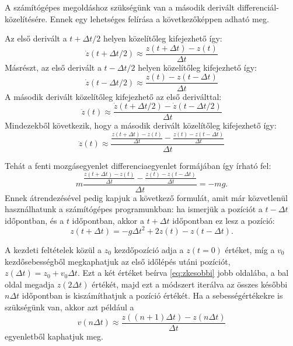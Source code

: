 \documentclass[%
 reprint,onecolumn,
 amsmath,amssymb,
 aps,
]{revtex4-2}
\begin{document}
A számítógépes megoldáshoz szükségünk van 
a második derivált differenciál-közelítésére.
Ennek egy lehetséges felírása a következőképpen
adható meg. 

Az első derivált a $t+\Delta t/2$ helyen 
közelítőleg kifejezhető így:
\begin{equation}
   \dot{z}(t+\Delta t/2)
   \approx \frac{z(t+\Delta t) - z(t)}{\Delta t}
\end{equation}
Másrészt, az 
első derivált a $t-\Delta t/2$ helyen 
közelítőleg kifejezhető így:
\begin{equation}
    \dot{z}(t-\Delta t/2) \approx 
    \frac{z(t) - z(t-\Delta t)}{\Delta t}
\end{equation}
A második derivált közelítőleg kifejezhető 
az első deriválttal: 
\begin{equation}
\ddot{z}(t)
\approx 
\frac{\dot{z}(t+\Delta t/2) - \dot{z}(t-\Delta t/2)}{\Delta t}
\end{equation}
Mindezekből következik, hogy 
a második derivált
közelítőleg kifejezhető így:
\begin{equation}
\ddot{z}(t)
\approx 
  \frac{\frac{z(t+\Delta t) - z(t)}{\Delta t}
  - \frac{z(t) - z(t-\Delta t)}{\Delta t}}{\Delta t}
\end{equation}



    
Tehát a fenti mozgásegyenlet 
differenciaegyenlet formájában így írható fel:
\begin{equation}
\label{eq:differenciaegyenlet}
    m \frac{\frac{z(t+\Delta t) - z(t)}{\Delta t}
  - \frac{z(t) - z(t-\Delta t)}{\Delta t}}{\Delta t}
    = - m g.
\end{equation}    
Ennek átrendezésével pedig kapjuk a következő 
formulát, amit már közvetlenül használhatunk 
a számítógépes programunkban:
ha ismerjük a pozíciót a $t-\Delta t$ időpontban,
és a $t$ időpontban, akkor a $t+\Delta t$ 
időpontban ez lesz a pozíció:
\begin{equation}
\label{eq:zkesobbi}
    z(t+\Delta t) = -g \Delta t^2 + 2 z(t) - z(t-\Delta t).
\end{equation}
    
A kezdeti feltételek közül a $z_0$ kezdőpozíció
adja a $z(t=0)$ értéket, míg a $v_0$
kezdősebességből megkaphatjuk az első
időlépés utáni pozíciót, $z(\Delta t) = z_0 + v_0 \Delta t$.
Ezt a két értéket beírva \eqref{eq:zkesobbi} jobb oldalába,
a bal oldal megadja $z(2\Delta t)$ értékét, majd
ezt a módszert iterálva az összes 
későbbi $n\Delta t$ időpontban is kiszámíthatjuk a
pozíció értékét. 
Ha a sebességértékekre is szükségünk van, akkor azt
például a 
\begin{equation}
    v(n \Delta t) \approx \frac{z((n+1) \Delta t) - z(n\Delta t)}{\Delta t}
\end{equation}
egyenletből kaphatjuk meg.
\end{document}

